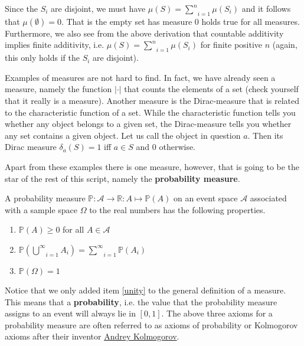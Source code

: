 \documentclass[a4paper,11pt,leqno]{report}
\begin{document}
Since the $ S_{i} $ are disjoint, we
must have $ \mu(S) = \underset{i=1}{\overset{n}{\sum}} \mu (S_{i}) $ and it follows that 
$ \mu(\emptyset) = 0 $.
That is the empty set has measure $ 0 $ holds true for all measures. Furthermore, we also see from the above
derivation that countable additivity implies finite additivity, i.e.
$ \mu(S) = \underset{i=1}{\overset{n}{\sum}} \mu(S_{i}) $ for finite positive $ n $ (again, this only
holds if the $ S_{i} $ are disjoint).

Examples of measures are not hard to find. In fact, we have already seen a measure,
namely the function $ |\cdot| $ that counts the elements of a set (check yourself that it really is a 
measure). Another measure is the Dirac-measure that is related to the characteristic
function of a set. While the characteristic function tells you whether any object belongs to a given set,
the Dirac-measure tells you whether any set contains a given object. Let us call the object in question
$ a $. Then its Dirac measure $ \delta_{a}(S) = 1 $ iff $ a \in S $ and 0 otherwise. 

Apart from these examples there is one measure, however, that is going to be the star of the rest of this 
script, namely the \textbf{probability measure}.

\begin{Definition}
A probability measure $ \mathbb{P}: \mathcal{A} \rightarrow \mathbb{R} : A \mapsto \mathbb{P}(A) $
on an event space $ \mathcal{A} $ associated with a sample space $ \Omega $ to the real numbers has the
following properties.
\begin{enumerate}
\item $ \mathbb{P}(A) \geq 0 $ for all $ A \in \mathcal{A} $
\item $ \mathbb{P}\left( \underset{i = 1}{\overset{\infty}{\bigcup}} A_{i} \right)
= \underset{i = 1}{\overset{\infty}{\sum}} \mathbb{P} \left( A_{i} \right) $ \label{union}
\item $ \mathbb{P}(\Omega) = 1 $ \label{unity}
\end{enumerate}
\end{Definition}

Notice that we only added item \ref{unity} to the general definition of a measure. This means that a
\textbf{probability}, i.e. the value that the probability measure assigns to an event will always lie in
$ [0,1] $. The above three axioms for a probability measure are often referred to as axioms of probability
or Kolmogorov axioms after their inventor \href{https://en.wikipedia.org/wiki/Andrey_Kolmogorov}{Andrey
Kolmogorov}.
\end{document}
